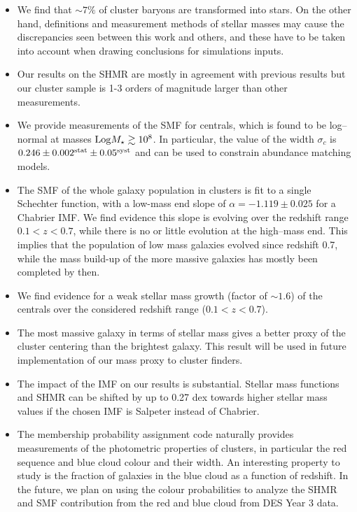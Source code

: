 {\begin{itemize}
\item We find that $\sim 7\%$ of cluster baryons are transformed into stars. On the other hand, definitions and measurement methods of stellar masses may cause the discrepancies seen between this work and others, and these have to be taken into account when drawing conclusions for simulations inputs. 

\item Our results on the SHMR are mostly in agreement with previous results but our cluster sample is 1-3 orders of magnitude larger than other measurements.

\item We provide measurements of the SMF for centrals, which is found to be log--normal at masses ${\rm Log} M_\star\gtrsim 10^8$. In particular, the value of the width $\sigma_c$ is $0.246  \pm 0.002^{\rm stat}\pm 0.05^{\rm syst}$ and can be used to constrain abundance matching models. 

\item The SMF of the whole galaxy population in clusters is fit to a single Schechter function, with a low-mass end slope of  $\alpha=-1.119\pm0.025$ for a Chabrier IMF. We find evidence this slope is evolving over the redshift range $0.1<z<0.7$, while there is no or little evolution at the high--mass end. This implies that the population of low mass galaxies evolved since redshift 0.7, while the mass build-up of the more massive galaxies has mostly been completed by then. 

\item We find evidence for a weak stellar mass growth (factor of $\sim 1.6$) of the centrals over the considered redshift range ($0.1<z<0.7$).

\item The most massive galaxy in terms of stellar mass gives a better proxy of the cluster centering than the brightest galaxy. This result will be used in future implementation of our mass proxy to cluster finders.

\item The impact of the IMF on our results is substantial. Stellar mass functions and SHMR can be shifted by up to 0.27 dex towards higher stellar mass values if the chosen IMF is Salpeter instead of Chabrier.  %

\item The membership probability assignment code naturally provides measurements of the photometric properties of clusters, in particular the red sequence and blue cloud colour and their width. An interesting property to study is the fraction of galaxies in the blue cloud as a function of redshift. In the future, we plan on using the colour probabilities to analyze the SHMR and SMF contribution from the red and blue cloud from DES Year 3 data.


\end{itemize}}
